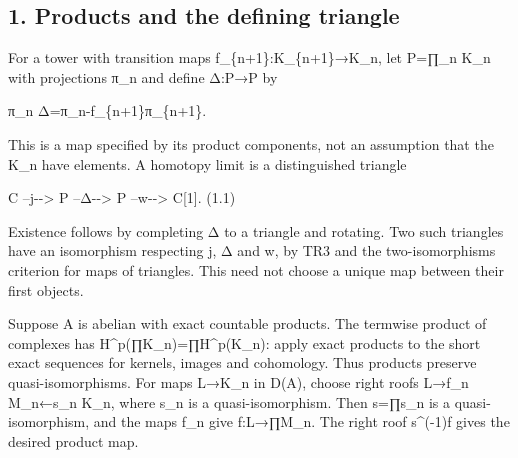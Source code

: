 \documentclass[11pt]{article}
\begin{document}
\subsection{1. Products and the defining triangle}\label{proofs-10435-10686-products-and-the-defining-triangle}

For a tower with transition maps f\_\allowbreak{}\{n\allowbreak{}+1\}:\allowbreak{}K\_\allowbreak{}\{n\allowbreak{}+1\}\allowbreak{}→K\_\allowbreak{}n,\allowbreak{} let P\allowbreak{}=∏\_\allowbreak{}n K\_\allowbreak{}n with projections π\_\allowbreak{}n and define Δ:\allowbreak{}P\allowbreak{}→P by

π\_\allowbreak{}n Δ\allowbreak{}=π\_\allowbreak{}n-f\_\allowbreak{}\{n\allowbreak{}+1\}π\_\allowbreak{}\{n\allowbreak{}+1\}.

This is a map specified by its product components,\allowbreak{} not an assumption that the K\_\allowbreak{}n have elements. A homotopy limit is a distinguished triangle

C --j-\allowbreak{}-> P --Δ-\allowbreak{}-> P --w-\allowbreak{}-> C[1]\allowbreak{}. (1.1)\allowbreak{}

Existence follows by completing Δ to a triangle and rotating. Two such triangles have an isomorphism respecting j,\allowbreak{} Δ and w,\allowbreak{} by TR3 and the two-isomorphisms criterion for maps of triangles. This need not choose a unique map between their first objects.

Suppose A is abelian with exact countable products. The termwise product of complexes has H\textasciicircum{}p(∏K\_\allowbreak{}n)\allowbreak{}\allowbreak{}=∏H\textasciicircum{}p(K\_\allowbreak{}n)\allowbreak{}:\allowbreak{} apply exact products to the short exact sequences for kernels,\allowbreak{} images and cohomology. Thus products preserve quasi-isomorphisms. For maps L\allowbreak{}→K\_\allowbreak{}n in D(A)\allowbreak{},\allowbreak{} choose right roofs L\allowbreak{}→f\_\allowbreak{}n M\_\allowbreak{}n←s\_\allowbreak{}n K\_\allowbreak{}n,\allowbreak{} where s\_\allowbreak{}n is a quasi-isomorphism. Then s\allowbreak{}=∏s\_\allowbreak{}n is a quasi-isomorphism,\allowbreak{} and the maps f\_\allowbreak{}n give f:\allowbreak{}L\allowbreak{}→∏M\_\allowbreak{}n. The right roof s\textasciicircum{}(-1)\allowbreak{}f gives the desired product map.
\end{document}
